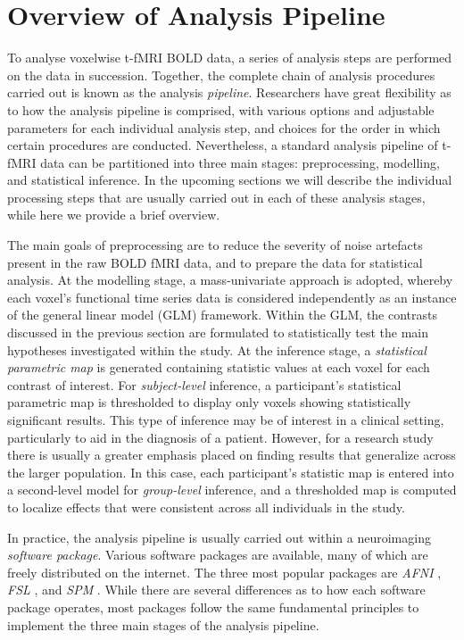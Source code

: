 \section{Overview of Analysis Pipeline}

To analyse voxelwise t-fMRI BOLD data, a series of analysis steps are performed on the data in succession. Together, the complete chain of analysis procedures carried out is known as the analysis \textit{pipeline}. Researchers have great flexibility as to how the analysis pipeline is comprised, with various options and adjustable parameters for each individual analysis step, and choices for the order in which certain procedures are conducted. Nevertheless, a standard analysis pipeline of t-fMRI data can be partitioned into three main stages: preprocessing, modelling, and statistical inference. In the upcoming sections we will describe the individual processing steps that are usually carried out in each of these analysis stages, while here we provide a brief overview.

The main goals of preprocessing are to reduce the severity of noise artefacts present in the raw BOLD fMRI data, and to prepare the data for statistical analysis. At the modelling stage, a mass-univariate approach is adopted, whereby each voxel's functional time series data is considered independently as an instance of the general linear model (GLM) framework. Within the GLM, the contrasts discussed in the previous section are formulated to statistically test the main hypotheses investigated within the study. At the inference stage, a \textit{statistical parametric map} is generated containing statistic values at each voxel for each contrast of interest. For \textit{subject-level} inference, a participant's statistical parametric map is thresholded to display only voxels showing statistically significant results. This type of inference may be of interest in a clinical setting, particularly to aid in the diagnosis of a patient. However, for a research study there is usually a greater emphasis placed on finding results that generalize across the larger population. In this case, each participant's statistic map is entered into a second-level model for \textit{group-level} inference, and a thresholded map is computed to localize effects that were consistent across all individuals in the study. 


In practice, the analysis pipeline is usually carried out within a neuroimaging \textit{software package}. Various software packages are available, many of which are freely distributed on the internet. The three most popular packages are \textit{AFNI} \citep{Cox1996-nu}, \textit{FSL} \citep{Jenkinson2012-wh}, and \textit{SPM} \citep{Penny2011-uk}. While there are several differences as to how each software package operates, most packages follow the same fundamental principles to implement the three main stages of the analysis pipeline.     


